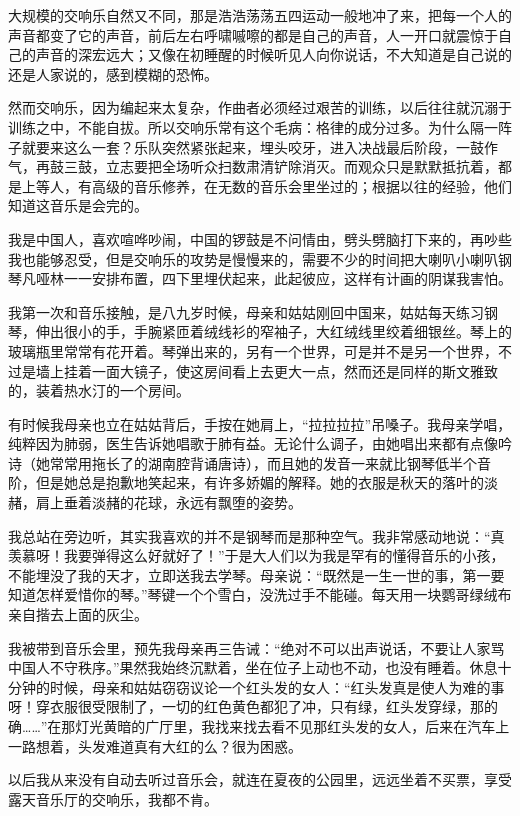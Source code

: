 \par 大规模的交响乐自然又不同，那是浩浩荡荡五四运动一般地冲了来，把每一个人的声音都变了它的声音，前后左右呼啸嘁嚓的都是自己的声音，人一开口就震惊于自己的声音的深宏远大；又像在初睡醒的时候听见人向你说话，不大知道是自己说的还是人家说的，感到模糊的恐怖。
\par 然而交响乐，因为编起来太复杂，作曲者必须经过艰苦的训练，以后往往就沉溺于训练之中，不能自拔。所以交响乐常有这个毛病：格律的成分过多。为什么隔一阵子就要来这么一套？乐队突然紧张起来，埋头咬牙，进入决战最后阶段，一鼓作气，再鼓三鼓，立志要把全场听众扫数肃清铲除消灭。而观众只是默默抵抗着，都是上等人，有高级的音乐修养，在无数的音乐会里坐过的；根据以往的经验，他们知道这音乐是会完的。
\par 我是中国人，喜欢喧哗吵闹，中国的锣鼓是不问情由，劈头劈脑打下来的，再吵些我也能够忍受，但是交响乐的攻势是慢慢来的，需要不少的时间把大喇叭小喇叭钢琴凡哑林一一安排布置，四下里埋伏起来，此起彼应，这样有计画的阴谋我害怕。
\par 我第一次和音乐接触，是八九岁时候，母亲和姑姑刚回中国来，姑姑每天练习钢琴，伸出很小的手，手腕紧匝着绒线衫的窄袖子，大红绒线里绞着细银丝。琴上的玻璃瓶里常常有花开着。琴弹出来的，另有一个世界，可是并不是另一个世界，不过是墙上挂着一面大镜子，使这房间看上去更大一点，然而还是同样的斯文雅致的，装着热水汀的一个房间。
\par 有时候我母亲也立在姑姑背后，手按在她肩上，“拉拉拉拉”吊嗓子。我母亲学唱，纯粹因为肺弱，医生告诉她唱歌于肺有益。无论什么调子，由她唱出来都有点像吟诗（她常常用拖长了的湖南腔背诵唐诗），而且她的发音一来就比钢琴低半个音阶，但是她总是抱歉地笑起来，有许多娇媚的解释。她的衣服是秋天的落叶的淡赭，肩上垂着淡赭的花球，永远有飘堕的姿势。
\par 我总站在旁边听，其实我喜欢的并不是钢琴而是那种空气。我非常感动地说：“真羡慕呀！我要弹得这么好就好了！”于是大人们以为我是罕有的懂得音乐的小孩，不能埋没了我的天才，立即送我去学琴。母亲说：“既然是一生一世的事，第一要知道怎样爱惜你的琴。”琴键一个个雪白，没洗过手不能碰。每天用一块鹦哥绿绒布亲自揩去上面的灰尘。
\par 我被带到音乐会里，预先我母亲再三告诫：“绝对不可以出声说话，不要让人家骂中国人不守秩序。”果然我始终沉默着，坐在位子上动也不动，也没有睡着。休息十分钟的时候，母亲和姑姑窃窃议论一个红头发的女人：“红头发真是使人为难的事呀！穿衣服很受限制了，一切的红色黄色都犯了冲，只有绿，红头发穿绿，那的确……”在那灯光黄暗的广厅里，我找来找去看不见那红头发的女人，后来在汽车上一路想着，头发难道真有大红的么？很为困惑。
\par 以后我从来没有自动去听过音乐会，就连在夏夜的公园里，远远坐着不买票，享受露天音乐厅的交响乐，我都不肯。
